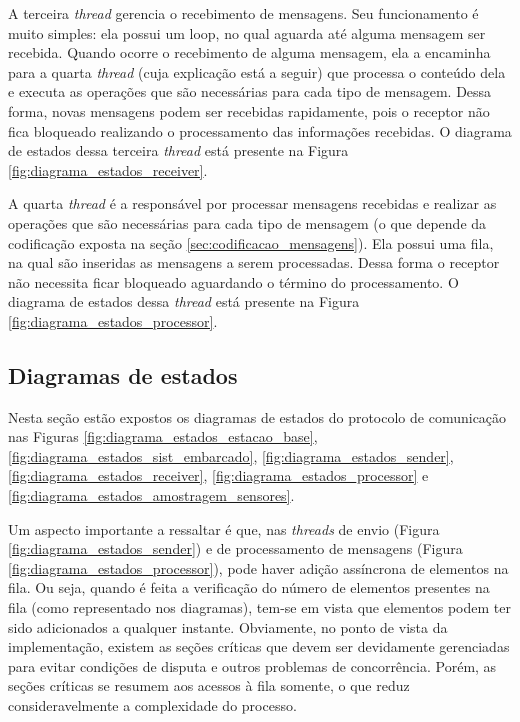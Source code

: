 A terceira \textit{thread} gerencia o recebimento de mensagens. Seu funcionamento é muito simples: ela possui um loop, no qual aguarda até alguma mensagem ser recebida. Quando ocorre o recebimento de alguma mensagem, ela a encaminha para a quarta \textit{thread} (cuja explicação está a seguir) que processa o conteúdo dela e executa as operações que são necessárias para cada tipo de mensagem. Dessa forma, novas mensagens podem ser recebidas rapidamente, pois o receptor não fica bloqueado realizando o processamento das informações recebidas. O diagrama de estados dessa terceira \textit{thread} está presente na Figura \ref{fig:diagrama_estados_receiver}.

A quarta \textit{thread} é a responsável por processar mensagens recebidas e realizar as operações que são necessárias para cada tipo de mensagem (o que depende da codificação exposta na seção \ref{sec:codificacao_mensagens}). Ela possui uma fila, na qual são inseridas as mensagens a serem processadas. Dessa forma o receptor não necessita ficar bloqueado aguardando o término do processamento. O diagrama de estados dessa \textit{thread} está presente na Figura \ref{fig:diagrama_estados_processor}.

\subsection{Diagramas de estados}

Nesta seção estão expostos os diagramas de estados do protocolo de comunicação nas Figuras \ref{fig:diagrama_estados_estacao_base}, \ref{fig:diagrama_estados_sist_embarcado}, \ref{fig:diagrama_estados_sender}, \ref{fig:diagrama_estados_receiver}, \ref{fig:diagrama_estados_processor} e \ref{fig:diagrama_estados_amostragem_sensores}.

Um aspecto importante a ressaltar é que, nas \textit{threads} de envio (Figura \ref{fig:diagrama_estados_sender}) e de processamento de mensagens (Figura \ref{fig:diagrama_estados_processor}), pode haver adição assíncrona de elementos na fila. Ou seja, quando é feita a verificação do número de elementos presentes na fila (como representado nos diagramas), tem-se em vista que elementos podem ter sido adicionados a qualquer instante. Obviamente, no ponto de vista da implementação, existem as seções críticas que devem ser devidamente gerenciadas para evitar condições de disputa e outros problemas de concorrência. Porém, as seções críticas se resumem aos acessos à fila somente, o que reduz consideravelmente a complexidade do processo.

